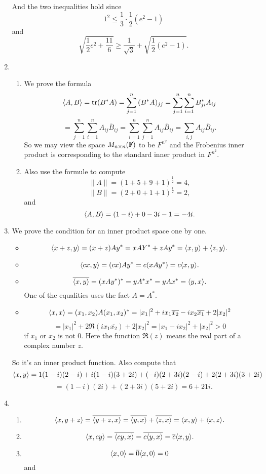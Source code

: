 \begin{enumerate}
And the two inequalities hold since
\[1^2 \leq \frac{1}{3}\cdot \frac{1}{2}(e^2-1)\]
and 
\[\sqrt{\frac{1}{2}e^2 + \frac{11}{6}} \geq \frac{1}{\sqrt{3}}+ \sqrt{\frac{1}{2}(e^2-1)}.\]
\item \begin{enumerate}
\item We prove the formula 
\[\langle A,B\rangle =\operatorname{tr}(B^*A)=\sum_{j=1}^n{(B^*A)_{jj}}=\sum_{j=1}^n{\sum_{i=1}^n{B^*_{ji}A_{ij}}}\]
\[=\sum_{j=1}^n{\sum_{i=1}^n{A_{ij}\overline{B}_{ij}}}=\sum_{i=1}^n{\sum_{j=1}^n{A_{ij}\overline{B}_{ij}}}=\sum_{i,j}{A_{ij}\overline{B}_{ij}}.\]
So we may view the space $M_{n\times n}(\mathbb{F})$ to be $F^{n^2}$ and the Frobenius inner product is corresponding to the standard inner product in $F^{n^2}$.
\item Also use the formule to compute
\[\|A\|=(1+5+9+1)^{\frac{1}{2}}=4,\]
\[\|B\|=(2+0+1+1)^{\frac{1}{2}}=2,\]
and 
\[\langle A,B\rangle =(1-i)+0-3i-1=-4i.\]
\end{enumerate}
\item We prove the condition for an inner product space one by one.
\begin{itemize}
\item \[\langle x+z,y\rangle =(x+z)Ay^*=xAY^*+zAy^*=\langle x,y\rangle +\langle z,y\rangle .\]
\item \[\langle cx,y\rangle =(cx)Ay^*=c(xAy^*)=c\langle x,y\rangle .\]
\item \[\overline{\langle x,y\rangle }=(xAy^*)^*=yA^*x^*=yAx^*=\langle y,x\rangle .\]
One of the equalities uses the fact $A=A^*$.
\item \[\langle x,x\rangle =(x_1,x_2)A(x_1,x_2)^* = |x_1|^2 + ix_1\overline{x_2}-ix_2\overline{x_1}+2|x_2|^2\]
\[= |x_1|^2 + 2\Re(ix_1\overline{x_2})+2|x_2|^2 = |x_1 - ix_2|^2 + |x_2|^2 > 0\]
if $x_1$ or $x_2$ is not $0$. Here the function $\Re(z)$ means the real part of a complex number $z$.
\end{itemize}
So it's an inner product function. Also compute that 
\[\langle x,y\rangle =1(1-i)(2-i)+i(1-i)(3+2i)+(-i)(2+3i)(2-i)+2(2+3i)(3+2i)\]
\[=(1-i)(2i)+(2+3i)(5+2i)=6+21i.\]
\item \begin{enumerate}
\item \[\langle x,y+z\rangle =\overline{\langle y+z,x\rangle }=\overline{\langle y,x\rangle }+\overline{\langle z,x\rangle }=\langle x,y\rangle +\langle x,z\rangle .\]
\item \[\langle x,cy\rangle =\overline{\langle cy,x\rangle }=\overline{c\langle y,x\rangle }=\overline{c}\langle x,y\rangle .\]
\item \[\langle x,0\rangle =\overline{0}\langle x,0\rangle =0\]
and 

\end{enumerate}
\end{enumerate}
